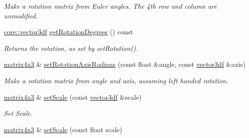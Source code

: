 \begin{DoxyCompactItemize}
\begin{DoxyCompactList}\small\item\em Make a rotation matrix from Euler angles. The 4th row and column are unmodified. \end{DoxyCompactList}\item 
\hyperlink{namespaceirr_1_1core_a06f169d08b5c429f5575acb7edbad811}{core\+::vector3df} \hyperlink{classirr_1_1core_1_1matrix4x3_a80d4941a98d63a19a73f4f4cf677b15a}{get\+Rotation\+Degrees} () const 
\begin{DoxyCompactList}\small\item\em Returns the rotation, as set by set\+Rotation(). \end{DoxyCompactList}\item 
\hyperlink{classirr_1_1core_1_1matrix4x3}{matrix4x3} \& \hyperlink{classirr_1_1core_1_1matrix4x3_ac3206798e7b264fa56806f4bb1e01c83}{set\+Rotation\+Axis\+Radians} (const float \&angle, const \hyperlink{namespaceirr_1_1core_a06f169d08b5c429f5575acb7edbad811}{vector3df} \&axis)
\begin{DoxyCompactList}\small\item\em Make a rotation matrix from angle and axis, assuming left handed rotation. \end{DoxyCompactList}\item 
\hyperlink{classirr_1_1core_1_1matrix4x3}{matrix4x3} \& \hyperlink{classirr_1_1core_1_1matrix4x3_a202272ffaac2c554248a1d865b45a46a}{set\+Scale} (const \hyperlink{namespaceirr_1_1core_a06f169d08b5c429f5575acb7edbad811}{vector3df} \&scale)\hypertarget{classirr_1_1core_1_1matrix4x3_a202272ffaac2c554248a1d865b45a46a}{}\label{classirr_1_1core_1_1matrix4x3_a202272ffaac2c554248a1d865b45a46a}

\begin{DoxyCompactList}\small\item\em Set Scale. \end{DoxyCompactList}\item 
\hyperlink{classirr_1_1core_1_1matrix4x3}{matrix4x3} \& \hyperlink{classirr_1_1core_1_1matrix4x3_aa5da343090100e00f189650463e5f6e0}{set\+Scale} (const float scale)\hypertarget{classirr_1_1core_1_1matrix4x3_aa5da343090100e00f189650463e5f6e0}{}\label{classirr_1_1core_1_1matrix4x3_aa5da343090100e00f189650463e5f6e0}


\end{DoxyCompactItemize}
